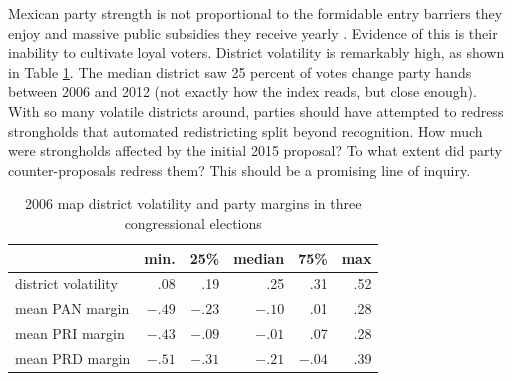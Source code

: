 \documentclass[letter,12pt]{article}
\begin{document}
Mexican party strength is not proportional to the formidable entry barriers they enjoy and massive public subsidies they receive yearly \citep{magar.2007ref.2015}. Evidence of this is their inability to cultivate loyal voters. District volatility is remarkably high, as shown in Table \ref{T:volatMarginsd0}. The median district saw 25 percent of votes change party hands between 2006 and 2012 (not exactly how the index reads, but close enough). With so many volatile districts around, parties should have attempted to redress strongholds that automated redistricting split beyond recognition. How much were strongholds affected by the initial 2015 proposal? To what extent did party counter-proposals redress them? This should be a promising line of inquiry. 

\begin{table}
\begin{center}
\begin{tabular}{lrrrrr}
                    &  min.   &  25\%   & median  & 75\%   & max \\ \hline
district volatility &  .08    & .19     & .25     & .31    & .52 \\
mean PAN margin     &  $-.49$ & $-.23$  & $-.10$  & .01    & .28 \\   
mean PRI margin     &  $-.43$ & $-.09$  & $-.01$  & .07    & .28 \\   
mean PRD margin     &  $-.51$ & $-.31$  & $-.21$  & $-.04$ & .39 \\
\end{tabular}
\caption{2006 map district volatility and party margins in three congressional elections}\label{T:volatMarginsd0}
\end{center}
\end{table}


\end{document}

